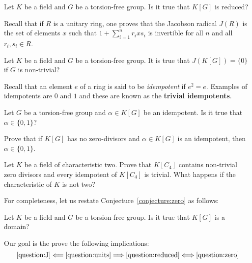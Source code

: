 \begin{question}
	\label{question:reduced}
	Let $K$ be a field and $G$ be a torsion-free group. Is it true that 
	$K[G]$ is reduced? 
\end{question}

Recall that if $R$ is a unitary ring, one proves that 
the Jacobson radical $J(R)$ is 
the set of elements $x$ such that
$1+\sum_{i=1}^n r_ixs_i$ is invertible 
for all $n$ and all $r_i,s_i\in R$.

\begin{question}
	\label{question:J}
	Let $K$ be a field and $G$ be a torsion-free group. It is true that 
	$J(K[G])=\{0\}$ if $G$ is non-trivial?
\end{question}

Recall that an element $e$ of a ring is said to be \emph{idempotent} 
if $e^2=e$. Examples of idempotents are $0$ and $1$ and 
these are known as the \textbf{trivial idempotents}. 

\begin{question}
	\label{question:idempotente}
	Let $G$ be a torsion-free group and $\alpha\in K[G]$ be an idempotent. 
	Is it true that $\alpha\in\{0,1\}$?
\end{question}

\begin{exercise}
	Prove that if $K[G]$ has no zero-divisors and $\alpha\in K[G]$ is an
	idempotent, then $\alpha\in\{0,1\}$.
\end{exercise}

\begin{exercise}
    Let $K$ be a field of characteristic two. 
	Prove that $K[C_4]$ contains non-trivial zero divisors and every
	idempotent of $K[C_4]$ is trivial. What happens if the characteristic of $K$ is not two?
\end{exercise}

For completeness, let us 
restate Conjecture~\ref{conjecture:zero} as follows:

\begin{question}
    \label{question:zero}
 	Let $K$ be a field and 
  $G$ be a torsion-free group. Is it true that 
 	$K[G]$ is a domain?
\end{question}

Our goal is the prove
the following implications:
\[
\ref{question:J}\Longleftarrow\ref{question:units}
\Longrightarrow\ref{question:reduced}
\Longleftrightarrow\ref{question:zero}
\]

